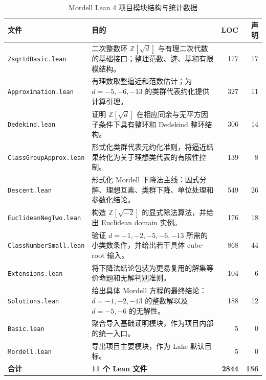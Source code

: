 \begin{table}[H]
\centering
\scriptsize
\setlength{\tabcolsep}{4pt}
\renewcommand{\arraystretch}{1.15}
\caption{Mordell Lean 4 项目模块结构与统计数据}
\label{tab:mordell-module-stats}
\begin{tabular}{@{}>{\raggedright\arraybackslash}p{}>{\raggedright\arraybackslash}p{}rr@{}}
\toprule
\textbf{文件} & \textbf{目的} & \textbf{LOC} & \textbf{声明} \\
\midrule
\texttt{ZsqrtdBasic.lean} &
二次整数环 \(\mathbb Z[\sqrt d]\) 与有理二次代数的基础接口；整理范数、迹、基和有限模结构。 &
177 & 17 \\
\texttt{Approximation.lean} &
有理数取整逼近和范数估计；为 \(d=-5,-6,-13\) 的类群代表约化提供计算引理。 &
327 & 11 \\
\texttt{Dedekind.lean} &
证明 \(\mathbb Z[\sqrt d]\) 在相应同余与无平方因子条件下具有整环和 Dedekind 整环结构。 &
306 & 14 \\
\texttt{ClassGroupApprox.lean} &
形式化类群代表元约化准则，将逼近结果转化为关于理想类代表的有限性控制。 &
139 & 8 \\
\texttt{Descent.lean} &
形式化 Mordell 下降法主线：因式分解、理想互素、类群下降、单位处理和参数化结论。 &
549 & 26 \\
\texttt{EuclideanNegTwo.lean} &
构造 \(\mathbb Z[\sqrt{-2}]\) 的显式除法算法，并给出 Euclidean domain 实例。 &
176 & 18 \\
\texttt{ClassNumberSmall.lean} &
验证 \(d=-1,-2,-5,-6,-13\) 所需的小类数条件，并给出若干具体 cube-root 输入。 &
868 & 44 \\
\texttt{Extensions.lean} &
将下降法结论包装为更易复用的解集等价命题和无解判别准则。 &
104 & 6 \\
\texttt{Solutions.lean} &
给出具体 Mordell 方程的最终结论：\(d=-1,-2,-13\) 的整数解以及 \(d=-5,-6\) 的无解性。 &
188 & 12 \\
\texttt{Basic.lean} &
聚合导入基础证明模块，作为项目内部的统一入口。 &
5 & 0 \\
\texttt{Mordell.lean} &
导出项目主要模块，作为 Lake 默认目标。 &
5 & 0 \\
\midrule
\textbf{合计} & \textbf{11 个 Lean 文件} & \textbf{2844} & \textbf{156} \\
\bottomrule
\end{tabular}
\end{table}
